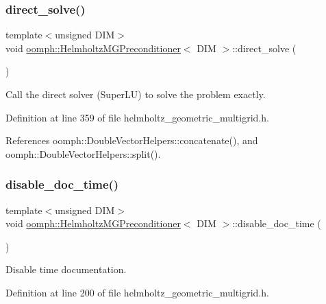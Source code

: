 \subsubsection{\texorpdfstring{direct\+\_\+solve()}{direct\_solve()}}
{\footnotesize\ttfamily template$<$unsigned D\+IM$>$ \\
void \hyperlink{classoomph_1_1HelmholtzMGPreconditioner}{oomph\+::\+Helmholtz\+M\+G\+Preconditioner}$<$ D\+IM $>$\+::direct\+\_\+solve (\begin{DoxyParamCaption}{ }\end{DoxyParamCaption})\hspace{0.3cm}{\ttfamily [inline]}}



Call the direct solver (Super\+LU) to solve the problem exactly. 



Definition at line 359 of file helmholtz\+\_\+geometric\+\_\+multigrid.\+h.



References oomph\+::\+Double\+Vector\+Helpers\+::concatenate(), and oomph\+::\+Double\+Vector\+Helpers\+::split().

\mbox{\label{classoomph_1_1HelmholtzMGPreconditioner_a52d0a5e2e0b2ac9cdbfbe639cd743eab}} 
\subsubsection{\texorpdfstring{disable\+\_\+doc\+\_\+time()}{disable\_doc\_time()}}
{\footnotesize\ttfamily template$<$unsigned D\+IM$>$ \\
void \hyperlink{classoomph_1_1HelmholtzMGPreconditioner}{oomph\+::\+Helmholtz\+M\+G\+Preconditioner}$<$ D\+IM $>$\+::disable\+\_\+doc\+\_\+time (\begin{DoxyParamCaption}{ }\end{DoxyParamCaption})\hspace{0.3cm}{\ttfamily [inline]}}



Disable time documentation. 



Definition at line 200 of file helmholtz\+\_\+geometric\+\_\+multigrid.\+h.

